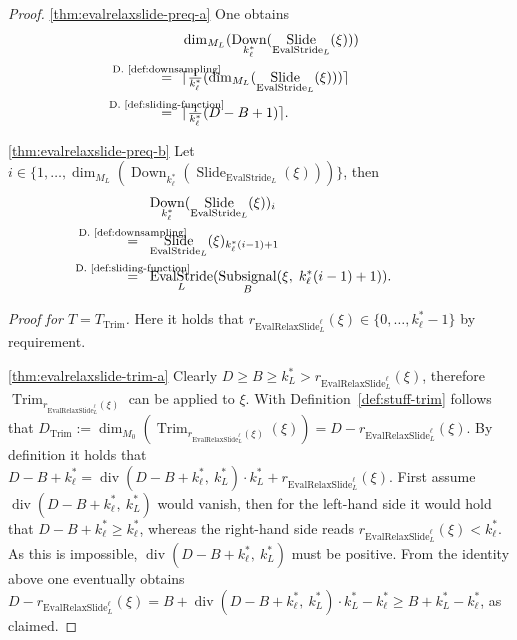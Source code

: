 \documentclass[journal]{IEEEtran}
\newcommand{\ROI}{B}
\newcommand{\discint}[2]{\{#1,\dotsc,#2\}}
\newcommand{\inint}[2]{\in\discint{#1}{#2}}
\newcommand{\nceil}[1]{\lceil #1 \rceil}
\DeclareMathOperator{\Subsignal}{Subsignal}
\DeclareMathOperator{\Slide}{Slide}
\DeclareMathOperator{\EvalStride}{EvalStride}
\DeclareMathOperator{\Trimming}{Trim}
\renewcommand{\div}[2]{\operatorname{div}(#1,\ #2)}
\newcommand{\equsing}[1]{\overset{\mathclap{\text{#1}}}{=}}
\DeclareMathOperator{\EvalRelaxSlide}{EvalRelaxSlide}
\DeclareMathOperator{\Downsampling}{Down}
\begin{document}
\begin{proof}
\ref{thm:evalrelaxslide-preq-a}
One obtains
\begin{align*}
  & \dim_{M_L}( \Downsampling_{k_\ell^*}( \Slide_{\EvalStride_L}(\xi) ) )\\
  \equsing{D.~\ref{def:downsampling}}\ \ & \nceil{\tfrac{1}{k_\ell^*}( \dim_{M_L}( \Slide_{\EvalStride_L}(\xi) ) )}\\
  \equsing{D.~\ref{def:sliding-function}}\ \ & \nceil{\tfrac{1}{k_\ell^*}( D - \ROI + 1 )}\text{.}
\end{align*}

\ref{thm:evalrelaxslide-preq-b}
Let $i\inint{1}{\dim_{M_L}( \Downsampling_{k_\ell^*}( \Slide_{\EvalStride_L}(\xi) ) )}$, then
\begin{align*}
  & \Downsampling_{k_\ell^*}( \Slide_{\EvalStride_L}(\xi) )_i\\
  \equsing{D.~\ref{def:downsampling}}\ \ & \Slide_{\EvalStride_L}(\xi)_{k_\ell^*(i - 1) + 1}\\
  \equsing{D.~\ref{def:sliding-function}}\ \ & \EvalStride_L(\Subsignal_\ROI(\xi,\; k_\ell^*(i - 1) + 1))\text{.}
\end{align*}

{\parindent0mm \emph{Proof for $T = T_{\Trimming}$.}}
Here it holds that $r_{\EvalRelaxSlide_L^\ell}(\xi)\inint{0}{k_\ell^* - 1}$ by requirement.

\ref{thm:evalrelaxslide-trim-a}
Clearly $D \geq \ROI \geq k_L^* > r_{\EvalRelaxSlide_L^\ell}(\xi)$, therefore $\Trimming_{r_{\EvalRelaxSlide_L^\ell}(\xi)}$ can be applied to $\xi$.
With Definition~\ref{def:stuff-trim} follows that $D_{\Trimming} := \dim_{M_0}( \Trimming_{r_{\EvalRelaxSlide_L^\ell}(\xi)}(\xi) ) = D - r_{\EvalRelaxSlide_L^\ell}(\xi)$.
By definition it holds that $D - \ROI + k_\ell^* = \div{D - \ROI + k_\ell^*}{k_L^*}\cdot k_L^* + r_{\EvalRelaxSlide_L^\ell}(\xi)$.
First assume $\div{D - \ROI + k_\ell^*}{k_L^*}$ would vanish, then for the left-hand side it would hold that $D - \ROI + k_\ell^* \geq k_\ell^*$, whereas the right-hand side reads $r_{\EvalRelaxSlide_L^\ell}(\xi) < k_\ell^*$.
As this is impossible, $\div{D - \ROI + k_\ell^*}{k_L^*}$ must be positive.
From the identity above one eventually obtains $D - r_{\EvalRelaxSlide_L^\ell}(\xi) = \ROI + \div{D - \ROI + k_\ell^*}{k_L^*}\cdot k_L^* - k_\ell^* \geq \ROI + k_L^* - k_\ell^*$, as claimed.


\end{proof}
\end{document}
